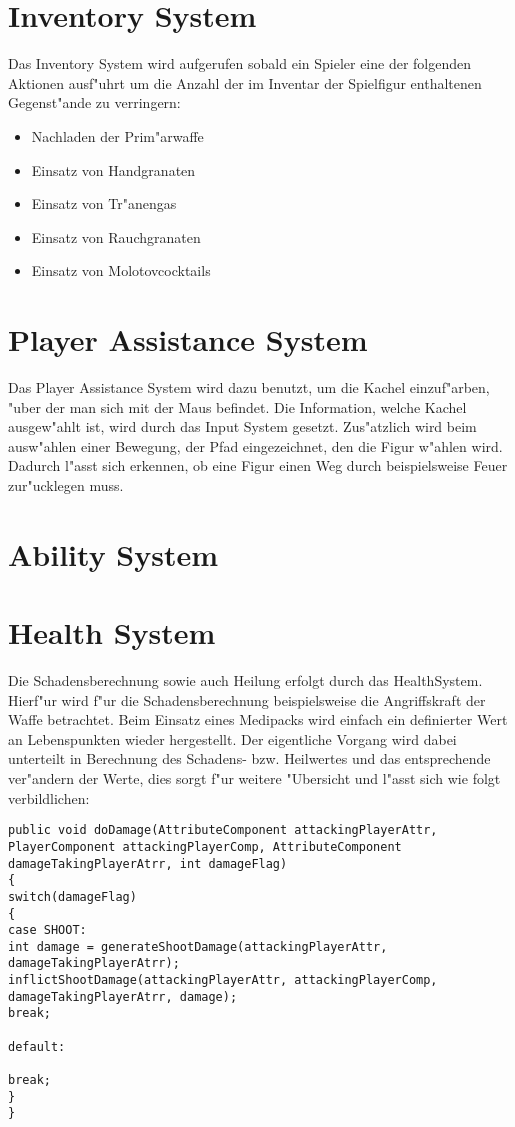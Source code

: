 \section{Inventory System}

Das Inventory System wird aufgerufen sobald ein Spieler eine der folgenden Aktionen ausf"uhrt um die Anzahl der im Inventar der Spielfigur enthaltenen Gegenst"ande zu verringern:\newline


\begin{itemize}
	\item Nachladen der Prim"arwaffe
	\item Einsatz von Handgranaten
	\item Einsatz von Tr"anengas
	\item Einsatz von Rauchgranaten
	\item Einsatz von Molotovcocktails
\end{itemize}





\section{Player Assistance System}
Das Player Assistance System wird dazu benutzt, um die Kachel einzuf"arben, "uber der man sich mit der Maus befindet. Die Information, welche Kachel ausgew"ahlt ist, wird durch das Input System gesetzt.
Zus"atzlich wird beim ausw"ahlen einer Bewegung, der Pfad eingezeichnet, den die Figur w"ahlen wird.
Dadurch l"asst sich erkennen, ob eine Figur einen Weg durch beispielsweise Feuer zur"ucklegen muss.


\section{Ability System}



\section{Health System}

Die Schadensberechnung sowie auch Heilung erfolgt durch das HealthSystem. Hierf"ur wird f"ur die Schadensberechnung beispielsweise die Angriffskraft der Waffe betrachtet. Beim Einsatz eines Medipacks wird einfach ein definierter Wert an Lebenspunkten wieder hergestellt.
Der eigentliche Vorgang wird dabei unterteilt in Berechnung des Schadens- bzw. Heilwertes und das entsprechende ver"andern der Werte, dies sorgt f"ur weitere "Ubersicht und l"asst sich wie folgt verbildlichen:

\begin{lstlisting}[breaklines = true]
public void doDamage(AttributeComponent attackingPlayerAttr, PlayerComponent attackingPlayerComp, AttributeComponent damageTakingPlayerAtrr, int damageFlag)
{
switch(damageFlag)
{
case SHOOT:
int damage = generateShootDamage(attackingPlayerAttr, damageTakingPlayerAtrr);
inflictShootDamage(attackingPlayerAttr, attackingPlayerComp, damageTakingPlayerAtrr, damage);                    
break;

default:

break;
}
}
\end{lstlisting}